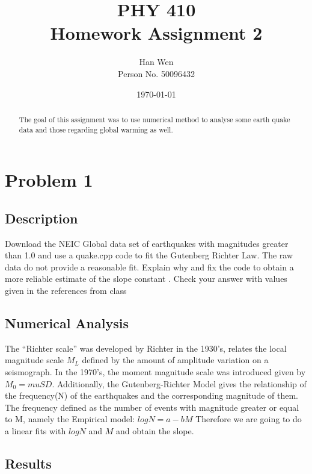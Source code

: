 \documentclass[11pt,letterpaper]{article}
\begin{document}
\title{PHY 410 \\ Homework Assignment 2}
\author{Han Wen \\ \tiny Person No. 50096432}
\date{\today}

\maketitle

\begin{abstract}
The goal of this assignment was to use numerical method to analyse some earth quake data and those regarding global warming as well.
\end{abstract}

\tableofcontents

\newpage
\section{Problem 1}

\subsection{Description}
Download the NEIC Global data set of earthquakes with magnitudes greater than 1.0 and use a quake.cpp code to fit the Gutenberg Richter Law. The raw data do not provide a reasonable fit. Explain why and fix the code to obtain a more reliable estimate of the slope constant  . Check your answer with values given in the references from class\cite{The Physics of Earthquakes}




\subsection{Numerical Analysis}
The “Richter scale” was developed by Richter in the 1930’s, relates the local magnitude scale $M_L$ defined by the amount of amplitude variation on a seismograph\cite{Seismographs and Seismograms}. In the 1970's, the moment magnitude scale was introduced given by $M_0=muSD$. Additionally, the Gutenberg-Richter Model gives the relationship of the frequency(N) of the earthquakes and the corresponding magnitude of them. The frequency defined as the number of events with magnitude greater or equal to M, namely the Empirical model:
$logN=a-bM$
Therefore we are going to do a linear fits with $logN$ and $M$ and obtain the slope.

\subsection{Results}
\end{document}
